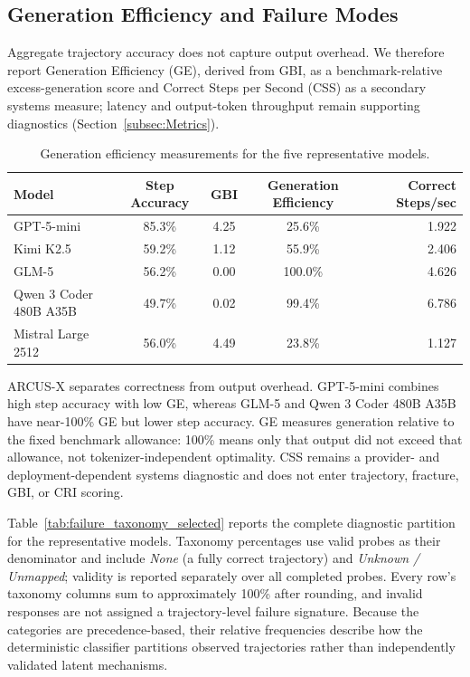 \documentclass{article}
\begin{document}
\subsection{Generation Efficiency and Failure Modes}
Aggregate trajectory accuracy does not capture output overhead. We therefore report Generation Efficiency (GE), derived from GBI, as a benchmark-relative excess-generation score and Correct Steps per Second (CSS) as a secondary systems measure; latency and output-token throughput remain supporting diagnostics (Section~\ref{subsec:Metrics}).
\begin{table}[!ht]
\centering
\caption{Generation efficiency measurements for the five representative models.}
\label{tab:generation_efficiency_selected}
\scriptsize
\begin{tabular}{lcccr}
\toprule
\textbf{Model} & \textbf{Step Accuracy} & \textbf{GBI} & \textbf{Generation Efficiency} & \textbf{Correct Steps/sec} \\
\midrule
GPT-5-mini & 85.3\% & 4.25 & 25.6\% & 1.922 \\
Kimi K2.5 & 59.2\% & 1.12 & 55.9\% & 2.406 \\
GLM-5 & 56.2\% & 0.00 & 100.0\% & 4.626 \\
Qwen 3 Coder 480B A35B & 49.7\% & 0.02 & 99.4\% & 6.786 \\
Mistral Large 2512 & 56.0\% & 4.49 & 23.8\% & 1.127 \\
\bottomrule
\end{tabular}
\end{table}

ARCUS-X separates correctness from output overhead. GPT-5-mini combines high step accuracy with low GE, whereas GLM-5 and Qwen 3 Coder 480B A35B have near-100\% GE but lower step accuracy. GE measures generation relative to the fixed benchmark allowance: 100\% means only that output did not exceed that allowance, not tokenizer-independent optimality. CSS remains a provider- and deployment-dependent systems diagnostic and does not enter trajectory, fracture, GBI, or CRI scoring.

Table~\ref{tab:failure_taxonomy_selected} reports the complete diagnostic partition for the representative models. Taxonomy percentages use valid probes as their denominator and include \emph{None} (a fully correct trajectory) and \emph{Unknown / Unmapped}; validity is reported separately over all completed probes. Every row's taxonomy columns sum to approximately 100\% after rounding, and invalid responses are not assigned a trajectory-level failure signature. Because the categories are precedence-based, their relative frequencies describe how the deterministic classifier partitions observed trajectories rather than independently validated latent mechanisms.
\end{document}
